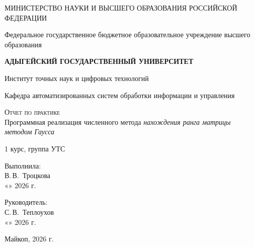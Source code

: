 \documentclass[12pt,a4paper]{scrartcl}
\begin{document}
\begin{titlepage}
    \begin{center}
        \large
        МИНИСТЕРСТВО НАУКИ И ВЫСШЕГО ОБРАЗОВАНИЯ РОССИЙСКОЙ ФЕДЕРАЦИИ
        
        Федеральное государственное бюджетное образовательное учреждение высшего образования
        
        \textbf{АДЫГЕЙСКИЙ ГОСУДАРСТВЕННЫЙ УНИВЕРСИТЕТ}
        \vspace{0.25cm}
        
        Институт точных наук и цифровых технологий
        
        Кафедра автоматизированных систем обработки информации и управления
        \vfill

        \vfill
        
        \textsc{Отчет по практике}\\[5mm]
        
        {\LARGE Программная реализация численного метода \textit{нахождения ранга матрицы методом Гаусса}}
        \bigskip
        
        1 курс, группа УТС
    \end{center}
    \vfill
    
    \newlength{\ML}
    \hfill\begin{minipage}{0.5\textwidth}
        Выполнила:\\
        \underline{\hspace{\ML}} В.\,В.~Троцкова\\
        «\underline{\hspace{0.7cm}}» \underline{\hspace{2cm}} 2026 г.
    \end{minipage}%
    \bigskip
    
    \hfill\begin{minipage}{0.5\textwidth}
        Руководитель:\\
        \underline{\hspace{\ML}} С.\,В.~Теплоухов\\
        «\underline{\hspace{0.7cm}}» \underline{\hspace{2cm}} 2026 г.
    \end{minipage}%
    \vfill
    
    \begin{center}
        Майкоп, 2026 г.
    \end{center}
\end{titlepage}
\end{document}
